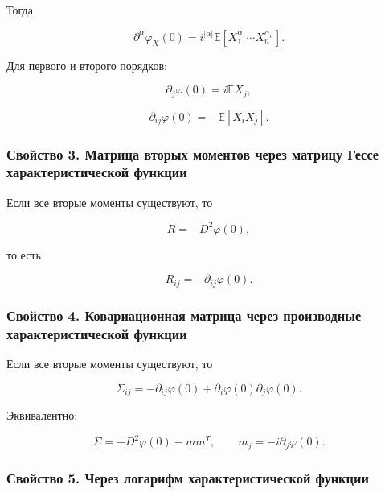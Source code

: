 \documentclass[
  11pt,
  a4paper,
]{article}
\begin{document}
Тогда

\[
\partial^\alpha\varphi_X(0)
=
i^{|\alpha|}
\mathbb E\left[X_1^{\alpha_1}\cdots X_n^{\alpha_n}\right].
\]

Для первого и второго порядков:

\[
\partial_j\varphi(0)=i\mathbb EX_j,
\]

\[
\partial_{ij}\varphi(0)=-\mathbb E[X_iX_j].
\]

\subsubsection{Свойство 3. Матрица вторых моментов через матрицу Гессе
характеристической
функции}\label{ux441ux432ux43eux439ux441ux442ux432ux43e-3.-ux43cux430ux442ux440ux438ux446ux430-ux432ux442ux43eux440ux44bux445-ux43cux43eux43cux435ux43dux442ux43eux432-ux447ux435ux440ux435ux437-ux43cux430ux442ux440ux438ux446ux443-ux433ux435ux441ux441ux435-ux445ux430ux440ux430ux43aux442ux435ux440ux438ux441ux442ux438ux447ux435ux441ux43aux43eux439-ux444ux443ux43dux43aux446ux438ux438}

Если все вторые моменты существуют, то

\[
R=-D^2\varphi(0),
\]

то есть

\[
R_{ij}=-\partial_{ij}\varphi(0).
\]

\subsubsection{Свойство 4. Ковариационная матрица через производные
характеристической
функции}\label{ux441ux432ux43eux439ux441ux442ux432ux43e-4.-ux43aux43eux432ux430ux440ux438ux430ux446ux438ux43eux43dux43dux430ux44f-ux43cux430ux442ux440ux438ux446ux430-ux447ux435ux440ux435ux437-ux43fux440ux43eux438ux437ux432ux43eux434ux43dux44bux435-ux445ux430ux440ux430ux43aux442ux435ux440ux438ux441ux442ux438ux447ux435ux441ux43aux43eux439-ux444ux443ux43dux43aux446ux438ux438}

Если все вторые моменты существуют, то

\[
\Sigma_{ij}
=
-\partial_{ij}\varphi(0)
+\partial_i\varphi(0)\partial_j\varphi(0).
\]

Эквивалентно:

\[
\Sigma=-D^2\varphi(0)-mm^T,
\qquad
m_j=-i\partial_j\varphi(0).
\]

\subsubsection{Свойство 5. Через логарифм характеристической
функции}\label{ux441ux432ux43eux439ux441ux442ux432ux43e-5.-ux447ux435ux440ux435ux437-ux43bux43eux433ux430ux440ux438ux444ux43c-ux445ux430ux440ux430ux43aux442ux435ux440ux438ux441ux442ux438ux447ux435ux441ux43aux43eux439-ux444ux443ux43dux43aux446ux438ux438}
\end{document}
